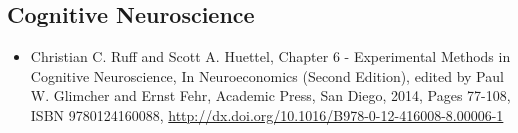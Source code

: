 \documentclass[12pt,article,oneside,a4paper]{memoir}
\begin{document}
\subsection{Cognitive Neuroscience}
\begin{itemize}
\item Christian C. Ruff and Scott A. Huettel, Chapter 6 - Experimental Methods in Cognitive Neuroscience, In Neuroeconomics (Second Edition), edited by Paul W. Glimcher and Ernst Fehr, Academic Press, San Diego, 2014, Pages 77-108, ISBN 9780124160088, \url{http://dx.doi.org/10.1016/B978-0-12-416008-8.00006-1}
\end{itemize}
\end{document}
